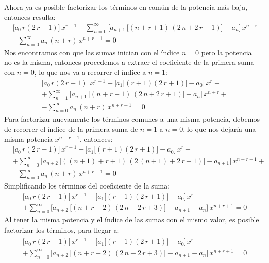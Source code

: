 Ahora ya es posible factorizar los términos en común de la potencia más baja, entonces resulta:
\begin{align*}
&\bigg[ a_{0} \, r (2 \, r - 1) \bigg] \, x^{r-1} + \sum_{n=0}^{\infty} \bigg[ a_{n+1} \, \big[ (n + r + 1) \, (2 \, n + 2 \, r + 1) \big] - a_{n} \bigg] \, x^{n+r} + \\[0.5em]
&- \sum_{n=0}^{\infty} a_{n} \, (n + r) \, x^{n+r+1}  = 0
\end{align*}
Nos encontramos con que las sumas inician con el índice $n = 0$ pero la potencia no es la misma, entonces procedemos a extraer el coeficiente de la primera suma con $n = 0$, lo que nos va a recorrer el índice a $n = 1$:
\begin{align*}
&\bigg[ a_{0} \, r (2 \, r - 1) \bigg] \, x^{r-1} + \bigg[ a_{1} \big[ (r + 1)(2 \, r + 1) \big] - a_{0} \bigg] \, x^{r} + \\[0.5em]
&+ \sum_{n=1}^{\infty} \bigg[ a_{n+1} \, \big[ (n + r + 1) \, (2 \, n + 2 \, r + 1) \big] - a_{n} \bigg] \, x^{n+r} + \\[0.5em]
&- \sum_{n=0}^{\infty} a_{n} \, (n + r) \, x^{n+r+1}  = 0
\end{align*}
Para factorizar nuevamente los términos comunes a una misma potencia, debemos de recorrer el índice de la primera suma de $n = 1$ a $n = 0$, lo que nos dejaría una misma potencia $x^{n+r+1}$, entonces:
\begin{align*}
&\bigg[ a_{0} \, r (2 \, r - 1) \bigg] \, x^{r-1} + \bigg[ a_{1} \big[ (r + 1)(2 \, r + 1) \big] - a_{0} \bigg] \, x^{r} + \\[0.5em]
&+ \sum_{n=0}^{\infty} \bigg[ a_{n+2} \, \big[ ((n+1) + r + 1) \, (2 \, (n+1) + 2 \, r + 1) \big] - a_{n+1} \bigg] \, x^{n+r+1} + \\[0.5em]
&- \sum_{n=0}^{\infty} a_{n} \, (n + r) \, x^{n+r+1}  = 0
\end{align*}
Simplificando los términos del coeficiente de la suma:
\begin{align*}
&\bigg[ a_{0} \, r (2 \, r - 1) \bigg] \, x^{r-1} + \bigg[ a_{1} \big[ (r + 1)(2 \, r + 1) \big] - a_{0} \bigg] \, x^{r} + \\[0.5em]
&+ \sum_{n=0}^{\infty} \bigg[ a_{n+2} \, \big[ (n + r + 2) \, (2 \, n + 2 \, r + 3) \big] - a_{n+1} - a_{n } \bigg] \, x^{n+r+1} = 0
\end{align*}
Al tener la misma potencia y el índice de las sumas con el mismo valor, es posible factorizar los términos, para llegar a:
\begin{align}
\begin{aligned}
&\bigg[ a_{0} \, r (2 \, r - 1) \bigg] \, x^{r-1} + \bigg[ a_{1} \big[ (r + 1)(2 \, r + 1) \big] - a_{0} \bigg] \, x^{r} + \\[0.5em]
&+ \sum_{n=0}^{\infty} \bigg[ a_{n+2} \, \big[ (n + r + 2) \, (2 \, n + 2 \, r + 3) \big] - a_{n+1} - a_{n } \bigg] \, x^{n+r+1} = 0
\end{aligned}
\label{eq:ecuacion_simplificada}
\end{align}

